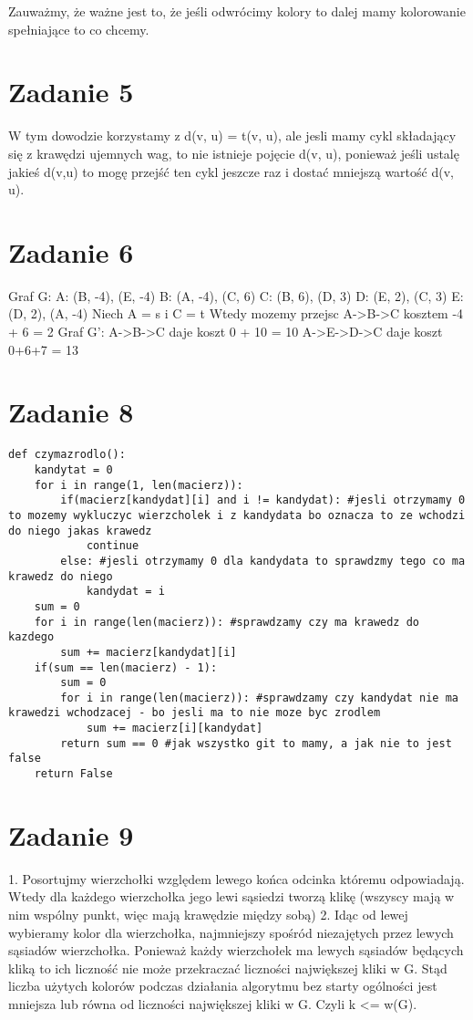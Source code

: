 \documentclass[12pt]{article}
\begin{document}
Zauważmy, że ważne jest to, że jeśli odwrócimy kolory to dalej mamy kolorowanie spełniające to co chcemy.

\section{Zadanie 5}%
W tym dowodzie korzystamy z d(v, u) = t(v, u), ale jesli mamy cykl składający się z krawędzi ujemnych wag, to nie istnieje pojęcie d(v, u), ponieważ jeśli ustalę jakieś d(v,u) to mogę przejść ten cykl jeszcze raz i dostać mniejszą wartość d(v, u).

\section{Zadanie 6} %
Graf G:
A: {(B, -4), (E, -4)}
B: {(A, -4), (C, 6)}
C: {(B, 6), (D, 3)}
D: {(E, 2), (C, 3)}
E: {(D, 2), (A, -4)}
Niech A = s i C = t 
Wtedy mozemy przejsc A->B->C kosztem -4 + 6 = 2
Graf G':
A->B->C daje koszt 0 + 10 = 10
A->E->D->C daje koszt 0+6+7 = 13
\section{Zadanie 8}%
\begin{lstlisting}
def czymazrodlo():
    kandytat = 0
    for i in range(1, len(macierz)):
        if(macierz[kandydat][i] and i != kandydat): #jesli otrzymamy 0 to mozemy wykluczyc wierzcholek i z kandydata bo oznacza to ze wchodzi do niego jakas krawedz 
            continue 
        else: #jesli otrzymamy 0 dla kandydata to sprawdzmy tego co ma krawedz do niego 
            kandydat = i 
    sum = 0 
    for i in range(len(macierz)): #sprawdzamy czy ma krawedz do kazdego
        sum += macierz[kandydat][i]
    if(sum == len(macierz) - 1): 
        sum = 0
        for i in range(len(macierz)): #sprawdzamy czy kandydat nie ma krawedzi wchodzacej - bo jesli ma to nie moze byc zrodlem
            sum += macierz[i][kandydat]
        return sum == 0 #jak wszystko git to mamy, a jak nie to jest false 
    return False 
\end{lstlisting}



\section{Zadanie 9}%
1. Posortujmy wierzchołki względem lewego końca odcinka któremu odpowiadają.
Wtedy dla każdego wierzchołka jego lewi sąsiedzi tworzą klikę (wszyscy mają w nim wspólny punkt, więc mają krawędzie między sobą)
2. Idąc od lewej wybieramy kolor dla wierzchołka, najmniejszy spośród niezajętych przez lewych sąsiadów wierzchołka.
Ponieważ każdy wierzchołek ma lewych sąsiadów będących kliką to ich liczność nie może przekraczać liczności największej kliki w G. Stąd liczba użytych kolorów podczas działania algorytmu bez starty ogólności jest mniejsza lub równa od liczności największej kliki w G. Czyli k <= w(G).
\end{document}
